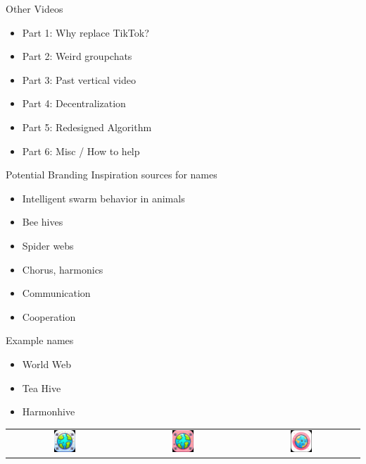 \documentclass[aspectratio=35]{beamer} %
\begin{document}
\begin{frame}{Other Videos}
\centering
\tiny
\vspace{-1.5in}
\begin{itemize}
    \item Part 1: Why replace TikTok?
    \item Part 2: Weird groupchats 
    \item Part 3: Past vertical video
    \item Part 4: Decentralization
    \item Part 5: Redesigned Algorithm
    \item Part 6: Misc / How to help
\end{itemize}
\end{frame}

\begin{frame}{Potential Branding}
\vspace{-0.2in}
\hspace{0.2in} {\tiny Inspiration sources for names}
\begin{itemize}
    \item Intelligent swarm behavior in animals
    \item Bee hives
    \item Spider webs
    \item Chorus, harmonics
    \item Communication
    \item Cooperation
\end{itemize}
\hspace{0.2in} {\tiny Example names}
\begin{itemize}
    \item World Web
    \item Tea Hive
    \item Harmonhive
\end{itemize}
\centering
\begin{tabular}{ccc}
    \includegraphics[width=0.2\textwidth]{imgs/app_icons/7.png} & \includegraphics[width=0.2\textwidth]{imgs/app_icons/8.png} & \includegraphics[width=0.2\textwidth]{imgs/app_icons/1.png} \\ 

\end{tabular}
\end{frame}
\end{document}
